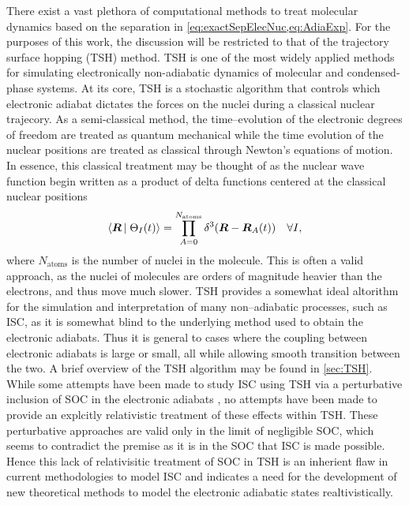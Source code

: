 There exist a vast plethora of computational methods to treat molecular dynamics
based on the separation in \cref{eq:exactSepElecNuc,eq:AdiaExp}. For the
purposes of this work, the discussion will be restricted to that of the
trajectory surface hopping (TSH) method.  TSH is one of the most widely applied
methods for simulating electronically non-adiabatic dynamics of molecular and
condensed-phase systems.\cite{Barbatti11_1759, Tavernelli14_62, Tully12_22A301,
Tully98_407, Hynes14_97} At its core, TSH is a stochastic algorithm that
controls which electronic adiabat dictates the forces on the nuclei during a
classical nuclear trajecory.\cite{Preston71_562} As a semi-classical method, the
time--evolution of the electronic degrees of freedom are treated as quantum
mechanical while the time evolution of the nuclear positions are treated as
classical through Newton's equations of motion. In essence, this classical
treatment may be thought of as the nuclear wave function begin written as a
product of delta functions centered at the classical nuclear positions
\begin{equation}
\left\langle \boldsymbol{R} \left\vert\right. \Theta_I (t) \right\rangle = 
  \prod_{A = 0}^{N_\mathrm{atoms}} \delta^3(\boldsymbol{R} - \boldsymbol{R}_A(t))
  \quad \forall I,
  \label{eq:ClassicalNuclei}
\end{equation}
where $N_\mathrm{atoms}$ is the number of nuclei in the molecule.  This is often
a valid approach, as the nuclei of molecules are orders of magnitude heavier
than the electrons, and thus move much slower. TSH provides a somewhat ideal
altorithm for the simulation and interpretation of many non--adiabatic
processes, such as ISC, as it is somewhat blind to the underlying method used to
obtain the electronic adiabats. Thus it is general to cases where the coupling
between electronic adiabats is large or small, all while allowing smooth
transition between the two. A brief overview of the TSH algorithm may be found
in \cref{sec:TSH}. While some attempts have been made to study ISC using TSH via
a perturbative inclusion of SOC in the electronic adiabats
\cite{Thiel14_JCP124101}, no attempts have been made to provide an explcitly
relativistic treatment of these effects within TSH. These perturbative
approaches are valid only in the limit of negligible SOC, which seems to
contradict the premise as it is in the SOC that ISC is made possible. Hence this
lack of relativisitic treatment of SOC in TSH is an inherient flaw in current
methodologies to model ISC and indicates a need for the development of new
theoretical methods to model the electronic adiabatic states realtivistically.

